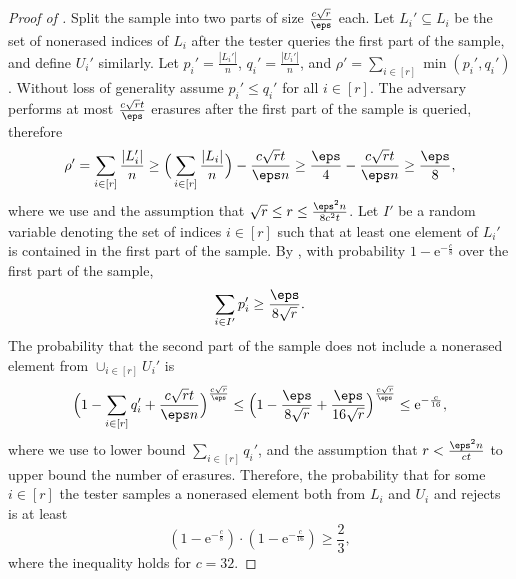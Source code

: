 \documentclass[11pt]{article}
\numberwithin{equation}{section}
\theoremstyle{definition}
\theoremstyle{plain}
\newcommand{\eee}{\mathrm e}
\begin{document}
\begin{proof}[Proof of ]
 Split the sample into two parts of size $\frac{c\sqrt{r}}{\eps}$ each. Let $L_i' \subseteq L_i$ be the set of nonerased indices of $L_i$ after the tester queries the first part of the sample, and define $U_i'$ similarly. Let $p_i' = \frac{|L_i' |}{n}$, $q_i' = \frac{|U_i' |}{n}$, and $\rho' = \sum_{i \in [r]} \min(p_i', q_i')$. Without loss of generality assume $p_i' \leq q_i'
$ for all $i \in [r]$. The adversary performs at most $\frac{c\sqrt{r}t}{\eps}$ erasures after the first part of the sample is queried, therefore 
\begin{equation*}
    \rho' = \sum_{i \in [r]} \frac{|L_i' |}{n} \geq  \Big(\sum_{i \in [r]} \frac{|L_i |}{n}\Big) - \frac{c\sqrt{r}t}{\eps n} \geq \frac{\eps}{4} - \frac{c\sqrt{r}t}{\eps n} \geq \frac{\eps}{8},
\end{equation*}
where we use  and the assumption that $\sqrt{r} \leq r \leq \frac{\eps^2 n}{8c^2 t}$.
Let $I'$ be a random variable denoting the set of indices $i \in [r]$ such that at least one element of $L_i'$ is contained in the first part of the sample. 
%
By , with probability $1- \eee^{-\frac{c}{8}}$ over the first part of the sample,
\begin{equation}\label{eq:pi}
     \sum_{i \in I'} p_i' \geq \frac{\eps}{8\sqrt{r}}.
\end{equation}
The probability that the second part of the sample does not include a nonerased element from $\cup_{i \in [r]} U_i'$ is
\begin{equation*}
    \Big ( 1 - \sum_{i\in [r]} q_i' + \frac{c\sqrt{r}t}{\eps n} \Big )^\frac{c\sqrt{r}}{\eps} \leq \Big ( 1 -  \frac{\eps}{8\sqrt{r}} + \frac{\eps}{16\sqrt{r}} \Big )^\frac{c\sqrt{r}}{\eps} \leq \eee^{-\frac{c}{16}},
\end{equation*}
where we use  to lower bound $\sum_{i\in [r]} q_i'$, and the assumption that $r < \frac{\eps^2 n}{ct}$ to upper bound the number of erasures. 
Therefore, the probability that for some $i \in [r]$ the tester samples a nonerased element both from $L_i$ and $U_i$ and rejects is at least
\begin{equation*}
 (1 - \eee^{-\frac{c}{8}}) \cdot (1 - \eee^{-\frac{c}{16}})\geq \frac{2}{3},
\end{equation*}
where the inequality holds for  $c= 32$. 
\end{proof}

%
%
\end{document}
